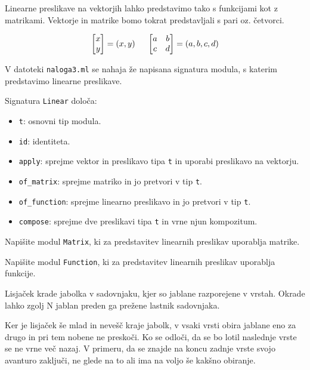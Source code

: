 \documentclass[arhiv]{../izpit}
\begin{document}
\naloga[]
Linearne preslikave na vektorjih lahko predstavimo tako s funkcijami kot z
matrikami.
Vektorje in matrike bomo tokrat predstavljali s pari oz. četvorci.

\[
\begin{bmatrix}
    x\\
    y
\end{bmatrix}
=
(x, y)
\hspace{5mm}
\begin{bmatrix}
    a & b \\
    c & d
\end{bmatrix}
=
(a, b, c, d)
\]

V datoteki \texttt{naloga3.ml} se nahaja že napisana signatura modula,
s katerim predstavimo linearne preslikave.

Signatura \texttt{Linear} določa:
\begin{itemize}
\item \texttt{t}: osnovni tip modula.
\item \texttt{id}: identiteta.
\item \texttt{apply}: sprejme vektor in preslikavo tipa \texttt{t} in uporabi preslikavo na vektorju.
\item \texttt{of\_matrix}: sprejme matriko in jo pretvori v tip \texttt{t}.
\item \texttt{of\_function}: sprejme linearno preslikavo in jo pretvori v tip \texttt{t}.
\item \texttt{compose}: sprejme dve preslikavi tipa \texttt{t} in vrne njun kompozitum.
\end{itemize}

\podnaloga
  Napišite modul \texttt{Matrix}, ki za predstavitev linearnih preslikav
  uporablja matrike.

\podnaloga
  Napišite modul \texttt{Function}, ki za predstavitev linearnih preslikav
  uporablja funkcije.

\naloga[]

Lisjaček krade jabolka v sadovnjaku, kjer so jablane razporejene v vrstah.
Okrade lahko zgolj N jablan preden ga prežene lastnik sadovnjaka.

Ker je lisjaček še mlad in nevešč kraje jabolk, v vsaki vrsti obira
jablane eno za drugo in pri tem nobene ne preskoči. Ko se odloči, da se bo
lotil naslednje vrste se ne vrne več nazaj. V primeru, da se znajde na koncu
zadnje vrste svojo avanturo zaključi, ne glede na to ali ima na voljo še kakšno
obiranje.
\end{document}
